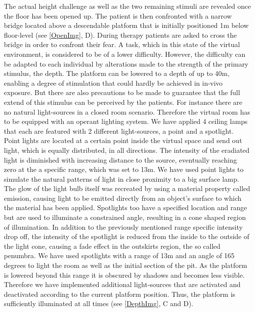 The actual height challenge as well as the two remaining stimuli are revealed once the floor has been opened up. The patient is then confronted with a narrow bridge located above a descendable platform that is initially positioned 1m below floor-level (see \ref{OpenImg}, D). During therapy patients are asked to cross the bridge in order to confront their fear. A task, which in this state of the virtual environment, is considered to be of a lower difficulty. However, the difficulty can be adapted to each individual by alterations made to the strength of the primary stimulus, the depth. The platform can be lowered to a depth of up to 40m, enabling a degree of stimulation that could hardly be achieved in in-vivo exposure. But there are also precautions to be made to guarantee that the full extend of this stimulus can be perceived by the patients.
For instance there are no natural light-sources in a closed room scenario. Therefore the virtual room has to be equipped with an operant lighting system. We have applied 4 ceiling lamps that each are featured with 2 different light-sources, a point and a spotlight. Point lights are located at a certain point inside the virtual space and send out light, which is equally distributed, in all directions. The intensity of the eradiated light is diminished with increasing distance to the source, eventually reaching zero at the a specific range, which was set to 13m. We have used point lights to simulate the natural patterns of light in close proximity to a big surface lamp. The glow of the light bulb itself was recreated by using a material property called emission, causing light to be emitted directly from an object's surface to which the material has been applied. Spotlights too have a specified location and range but are used to illuminate a constrained angle, resulting in a cone shaped region of illumination. In addition to the previously mentioned range specific intensity drop off, the intensity of the spotlight is reduced from the inside to the outside of the light cone, causing a fade effect in the outskirts region, the so called penumbra. We have used spotlights with a range of 13m and an angle of 165 degrees to light the room as well as the initial section of the pit. As the platform is lowered beyond this range it is obscured by shadows and becomes less visible. Therefore we have implemented additional light-sources that are activated and deactivated according to the current platform position. Thus, the platform is sufficiently illuminated at all times (see \ref{DepthImg}, C and D).

